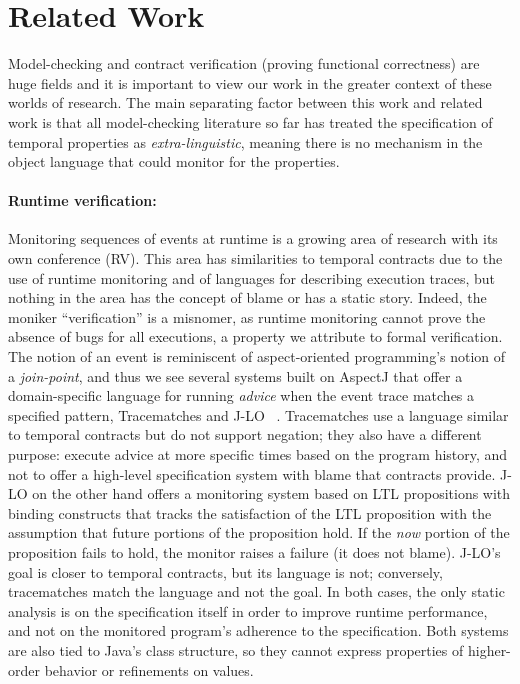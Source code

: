 \section{Related Work}

Model-checking and contract verification (proving functional correctness) are huge fields and it is important to view our work in the greater context of these worlds of research.
%
The main separating factor between this work and related work is that all model-checking literature so far has treated the specification of temporal properties as \emph{extra-linguistic}, meaning there is no mechanism in the object language that could monitor for the properties.

\paragraph{Runtime verification:}
Monitoring sequences of events at runtime is a growing area of research with its own conference (RV).
%
This area has similarities to temporal contracts due to the use of runtime monitoring and of languages for describing execution traces, but nothing in the area has the concept of blame or has a static story.
%
Indeed, the moniker ``verification'' is a misnomer, as runtime monitoring cannot prove the absence of bugs for all executions, a property we attribute to formal verification.
%
The notion of an event is reminiscent of aspect-oriented programming's notion of a \emph{join-point}, and thus we see several systems built on AspectJ \citep{aspectj} that offer a domain-specific language for running \emph{advice} when the event trace matches a specified pattern, \eg Tracematches \citep{ianjohnson:Allan05addingtrace} and J-LO ~\citep{ianjohnson:jlo}.
%
Tracematches use a language similar to temporal contracts but do not support negation; they also have a different purpose: execute advice at more specific times based on the program history, and not to offer a high-level specification system with blame that contracts provide.
%
J-LO on the other hand offers a monitoring system based on LTL propositions with binding constructs that tracks the satisfaction of the LTL proposition with the assumption that future portions of the proposition hold.
%
If the \emph{now} portion of the proposition fails to hold, the monitor raises a failure (it does not blame).
%
J-LO's goal is closer to temporal contracts, but its language is not; conversely, tracematches match the language and not the goal.
%
In both cases, the only static analysis is on the specification itself in order to improve runtime performance, and not on the monitored program's adherence to the specification.
%
Both systems are also tied to Java's class structure, so they cannot express properties of higher-order behavior or refinements on values.

